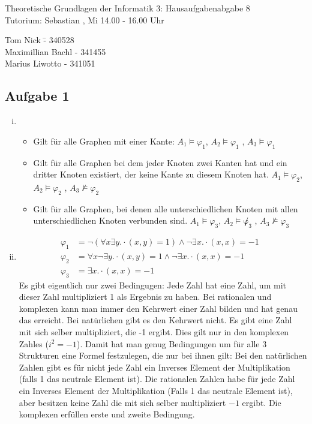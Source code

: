 \documentclass[a4paper,10pt]{article}
\begin{document}
\begin{center}
\Large{Theoretische Grundlagen der Informatik 3: Hausaufgabenabgabe 8} \\
\large{Tutorium: Sebastian , Mi 14.00 - 16.00 Uhr}
\end{center}
\begin{tabbing}
Tom Nick \hspace{2cm}\= - 340528\\
Maximillian Bachl \> - 341455 \\
Marius Liwotto\> -  341051
\end{tabbing}
\subsection*{Aufgabe 1}
\begin{enumerate}[(i)]
	\item 
	\begin{itemize}
		\item 	Gilt für alle Graphen mit einer Kante: $A_1 \vDash \varphi_1$, $A_2 \vDash \varphi_1$ , $A_3 \vDash \varphi_1$
		\item 	Gilt für alle Graphen bei dem jeder Knoten zwei Kanten hat und ein dritter Knoten existiert, der keine Kante zu diesem Knoten hat.
			$A_1 \vDash \varphi_2$, $A_2 \vDash \varphi_2$ , $A_3 \not\vDash \varphi_2$
		\item  	Gilt für alle Graphen, bei denen alle unterschiedlichen Knoten mit allen unterschiedlichen Knoten verbunden sind.
			$A_1 \vDash \varphi_3$, $A_2 \vDash \not\varphi_3$ , $A_3 \not\vDash \varphi_3$
	\end{itemize}
	\item 
	\begin{align*}
		\varphi_1 &= \lnot(\forall x \exists y. \cdot( x, y ) = 1) \land \lnot \exists x. \cdot(x,x) = -1 &\\
		\varphi_2 &= \forall x \lnot \exists y. \cdot( x, y ) = 1 \land \lnot \exists x. \cdot(x,x) = -1& \\
		\varphi_3 &= \exists x. \cdot(x,x) = -1&
	\end{align*}
	Es gibt eigentlich nur zwei Bedingugen: Jede Zahl hat eine Zahl, um mit dieser Zahl multipliziert 1 als Ergebnis zu haben. Bei rationalen und komplexen kann man immer den Kehrwert einer Zahl bilden und hat genau das erreicht. Bei natürlichen gibt es den Kehrwert nicht. Es gibt eine Zahl mit sich selber multipliziert, die -1 ergibt. Dies gilt nur in den komplexen Zahles ($i^2 = -1$). Damit hat man genug Bedingungen um für alle 3 Strukturen eine Formel festzulegen, die nur bei ihnen gilt: Bei den natürlichen Zahlen gibt es für nicht jede Zahl ein Inverses Element der Multiplikation (falls 1 das neutrale Element ist). Die rationalen Zahlen habe für jede Zahl ein Inverses Element der Multiplikation (Falls 1 das neutrale Element ist), aber besitzen keine Zahl die mit sich selber multipliziert $-1$ ergibt. Die komplexen erfüllen erste und zweite Bedingung.
	
\end{enumerate}
\end{document}

